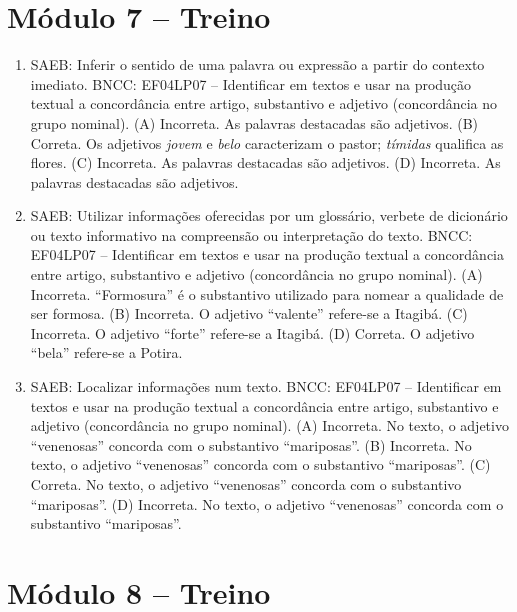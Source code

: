 \section*{Módulo 7 – Treino}

\begin{enumerate}
\item
SAEB: Inferir o sentido de uma palavra ou expressão a partir do
contexto imediato.
BNCC: EF04LP07 -- Identificar em textos e usar na produção textual a
concordância entre artigo, substantivo e adjetivo (concordância no grupo
nominal).
(A)  Incorreta. As palavras destacadas são adjetivos.
(B)  Correta. Os adjetivos \textit{jovem} e \textit{belo} caracterizam o
pastor; \textit{tímidas} qualifica as flores.
(C)  Incorreta. As palavras destacadas são adjetivos.
(D)  Incorreta. As palavras destacadas são adjetivos.

\item
SAEB: Utilizar informações oferecidas por um glossário, verbete de
dicionário ou texto informativo na compreensão ou interpretação do
texto.
BNCC: EF04LP07 -- Identificar em textos e usar na produção textual a
concordância entre artigo, substantivo e adjetivo (concordância no grupo
nominal).
(A) Incorreta. ``Formosura'' é o substantivo utilizado para nomear a qualidade
de ser formosa.
(B) Incorreta. O adjetivo ``valente'' refere-se a Itagibá.
(C)  Incorreta. O adjetivo ``forte'' refere-se a Itagibá.
(D)  Correta. O adjetivo ``bela'' refere-se a Potira.

\item
SAEB: Localizar informações num texto.
BNCC: EF04LP07 -- Identificar em textos e usar na produção textual a
concordância entre artigo, substantivo e adjetivo (concordância no grupo
nominal).
(A) Incorreta. No texto, o adjetivo ``venenosas'' concorda com o substantivo ``mariposas''.
(B) Incorreta. No texto, o adjetivo ``venenosas'' concorda com o substantivo ``mariposas''.
(C) Correta. No texto, o adjetivo ``venenosas'' concorda com o substantivo ``mariposas''.
(D) Incorreta. No texto, o adjetivo ``venenosas'' concorda com o substantivo ``mariposas''.
\end{enumerate}

\section*{Módulo 8 – Treino}

